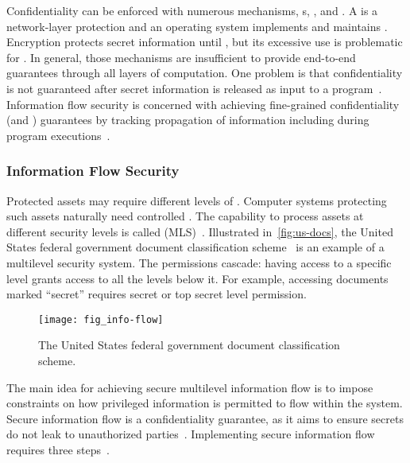 Confidentiality can be enforced with numerous mechanisms, \eg {}s, , and .
A  is a network-layer protection and an operating system implements and maintains .
Encryption protects secret information until , but its excessive use is problematic for .
In general, those mechanisms are insufficient to provide end-to-end guarantees through all layers of computation.
One problem is that confidentiality is not guaranteed after secret information is released as input to a program~\cite{zdancewic2004}.
Information flow security is concerned with achieving fine-grained confidentiality (and ) guarantees by tracking propagation of information including during program executions~\cite{hedin2012,eggert2014}.

\subsubsection{Information Flow Security}\label{if-security}

Protected assets may require different levels of .
Computer systems protecting such assets naturally need controlled .
The capability to process assets at different security levels is called {\emph{} (MLS)}~\cite{bossi2005}.
Illustrated in~\autoref{fig:us-docs}, the United States federal government document classification scheme~\cite{wiki_us_docs} is an example of a multilevel security system.
The permissions cascade: having access to a specific level grants access to all the levels below it.
For example, accessing documents marked \enquote{secret} requires secret or top secret level permission.

\begin{figure}[t]
\centering
\texttt{[image: fig\_info-flow]}
\caption[Document classification scheme]
{The United States federal government document classification scheme.}
\label{fig:us-docs}
\end{figure}


The main idea for achieving secure multilevel information flow is to impose constraints on how privileged information is permitted to flow within the system.
Secure information flow is a confidentiality guarantee, as it aims to ensure secrets do not leak to unauthorized parties~\cite{piessens2024}.
Implementing secure information flow requires three steps~\cite{eggert2014}.


